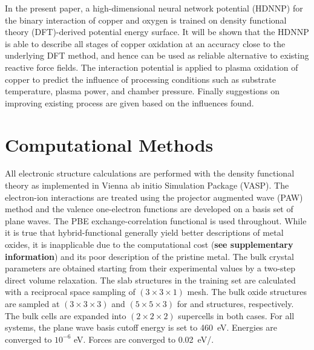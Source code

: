 \documentclass[manuscript=cmatex]{achemso}
\begin{document}



In the present paper, a high-dimensional neural network potential (HDNNP) for the binary interaction of copper and oxygen is trained on density functional theory (DFT)-derived potential energy surface. It will be shown that the HDNNP is able to describe all stages of copper oxidation at an accuracy close to the underlying DFT method, and hence can be used as reliable alternative to existing reactive force fields. The interaction potential is applied to plasma oxidation of copper to predict the influence of processing conditions such as substrate temperature, plasma power, and chamber pressure. Finally suggestions on improving existing process are given based on the influences found.
\section{Computational Methods}
All electronic structure calculations are performed with the density functional theory as implemented in Vienna ab initio Simulation Package (VASP)\cite{VASP:1994,VASP:1996,Kresse:1996}. The electron-ion interactions are treated using the projector augmented wave (PAW) method\cite{VASP:1999} and the valence one-electron functions are developed on a basis set of plane waves. The PBE exchange-correlation functional\cite{PBE:1996} is used throughout. While it is true that hybrid-functional generally yield better descriptions of metal oxides, it is inapplicable due to the computational cost (\textbf{see supplementary information}) and its poor description of the pristine metal. The bulk crystal parameters are obtained starting from their experimental values\cite{CRC:97} by a two-step direct volume relaxation. The slab structures in the training set are calculated with a reciprocal space sampling of $(3\times3\times1)$ mesh. The bulk oxide structures are sampled at $(3\times3\times3)$ and $(5\times5\times3)$ for  and  structures, respectively. The bulk cells are expanded into $(2\times2\times2)$ supercells in both cases. For all systems, the plane wave basis cutoff energy is set to \SI{460}{eV}. Energies are converged to $10^{-6}$ eV. Forces are converged to \SI{0.02}{eV/{\angstrom}}.
\end{document}
